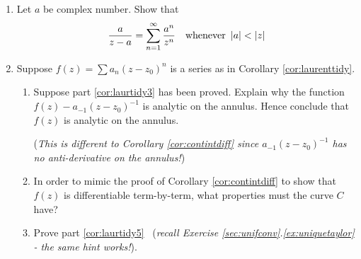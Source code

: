 \begin{exercises}
\begin{enumerate}
		
		\item Let $a$ be complex number. Show that
		\[
			\frac a{z-a}=\sum_{n=1}^\infty\frac{a^n}{z^n}
			\quad\text{whenever }
			\left| a\right|<\left| z\right|
		\]
		
		
	  \item\label{exs:laurenttidy} Suppose $f(z)=\sum a_n(z-z_0)^n$ is a series as in Corollary \ref{cor:laurenttidy}.
	  \begin{enumerate}
	    \item Suppose part \ref*{cor:laurtidy3} has been proved. Explain why the function $f(z)-a_{-1}(z-z_0)^{-1}$ is analytic on the annulus. Hence conclude that $f(z)$ is analytic on the annulus.\par
	    (\emph{This is different to Corollary \ref{cor:contintdiff} since $a_{-1}(z-z_0)^{-1}$ has no anti-derivative on the annulus!})
	    \item In order to mimic the proof of Corollary \ref{cor:contintdiff} to show that $f(z)$ is differentiable term-by-term, what properties must the curve $C$ have?
	    \item Prove part \ref*{cor:laurtidy5} \ (\emph{recall Exercise \ref*{sec:unifconv}.\ref{ex:uniquetaylor} - the same hint works!}).
		\end{enumerate}
	\end{enumerate}
\end{exercises}


